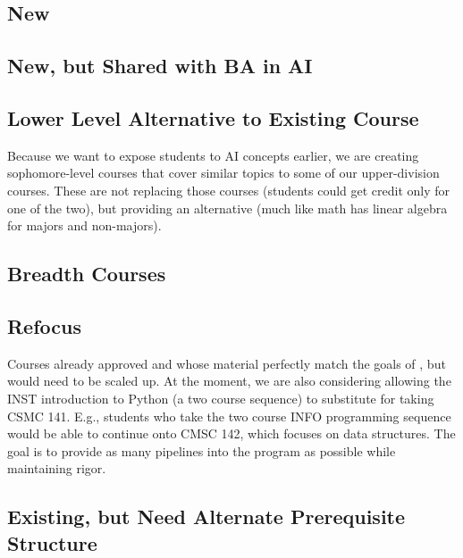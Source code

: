 \documentclass[
10pt, %
a4paper, %
oneside, %
headinclude,footinclude, %
BCOR5mm, %
]{scrartcl}
\begin{document}
  \subsection{New}

  

  \subsection{New, but Shared with BA in AI}

  

    \subsection{Lower Level Alternative to Existing Course}

    Because we want to expose students to AI concepts earlier, we are creating sophomore-level courses that cover similar topics to some of our upper-division courses.  These are not replacing those courses (students could get credit only for one of the two), but providing an alternative (much like math has linear algebra for majors and non-majors).

    

    \subsection{Breadth Courses}

    

  \subsection{Refocus}

    Courses already approved and whose material perfectly match the goals of \short{}, but would need to be scaled up.  At the moment, we are also considering allowing the INST introduction to Python (a two course sequence) to substitute for taking CSMC 141.  E.g., students who take the two course INFO programming sequence would be able to continue onto CMSC 142, which focuses on data structures.  The goal is to provide as many pipelines into the program as possible while maintaining rigor.
    
  


    \subsection{Existing, but Need Alternate Prerequisite Structure}
\end{document}

